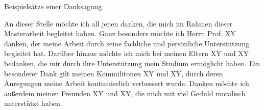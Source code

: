 
Beispielsätze einer Danksagung

An dieser Stelle möchte ich all jenen danken, die mich im Rahmen dieser Masterarbeit begleitet haben.
Ganz besonders möchte ich Herrn Prof. XY danken, der meine Arbeit durch seine fachliche und persönliche Unterstützung begleitet hat.
Darüber hinaus möchte ich mich bei meinen Eltern XY und XY bedanken, die mir durch ihre Unterstützung mein Studium ermöglicht haben.
Ein besonderer Dank gilt meinen Kommilitonen XY und XY, durch deren Anregungen meine Arbeit kontinuierlich verbessert wurde.
Danken möchte ich außerdem meinen Freunden XY und XY, die mich mit viel Geduld moralisch unterstützt haben.
